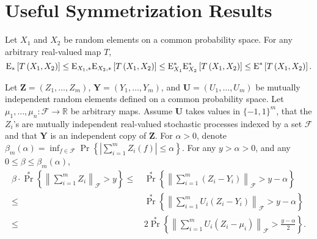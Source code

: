 
\section{Useful Symmetrization Results}

\begin{lemma}
\label{lem--vdvw23-lem-1-2-6}
Let \(X_{1}\) and \(X_{2}\) be random elements on a common probability space.
For any arbitrary real-valued map \(T\),
\begin{equation*}
  \mathrm{E}_{\ast} \left[ T \left( X_{1}, X_{2} \right) \right] \leq \mathrm{E}_{X_{1},
  \ast} \mathrm{E}_{X_{2}, \ast} \left[ T \left( X_{1}, X_{2} \right) \right] \leq
  \mathrm{E}_{X_{1}}^{\ast} \mathrm{E}_{X_{2}}^{\ast} \left[ T \left( X_{1}, X_{2} \right)
  \right] \leq \mathrm{E}^{\ast} \left[ T \left( X_{1}, X_{2} \right) \right].
\end{equation*}
\end{lemma}

\begin{lemma}
\label{lem--symm-1}
Let \(\mathbf{Z} = \left( Z_{1}, \dots, Z_{m} \right)\), \(\mathbf{Y} = \left(
Y_{1}, \dots, Y_{m} \right)\), and \(\mathbf{U} = \left( U_{1}, \dots, U_{m}
\right)\) be mutually independent random elements defined on a common
probability space.
Let \(\mu_{1}, \dots, \mu_{n} : \mathcal{F} \to \mathbb{R}\) be arbitrary maps.
Assume \(\mathbf{U}\) takes values in \(\{- 1, 1\}^{m}\), that the \(Z_{i}\)'s
are mutually independent real-valued stochastic processes indexed by a set
\(\mathcal{F}\) and that \(\mathbf{Y}\) is an independent copy of
\(\mathbf{Z}\).
For \(\alpha > 0\), denote \(\beta_{m} (\alpha) = \inf_{f \in \mathcal{F}} \Pr
\left\{ \left| \sum_{i = 1}^{m} Z_{i} (f) \right| \leq \alpha \right\}\).
For any \(y > \alpha > 0\), and any \(0 \leq \beta \leq \beta_{m} (\alpha)\),
\begin{align}
  \beta \cdot \Pr^{\ast} \left\{ \left\| \sum_{i = 1}^{m} Z_{i}
  \right\|_{\mathcal{F}} > y \right\} \leq
  & \, \Pr^{\ast} \left\{ \left\| \sum_{i = 1}^{m} \left( Z_{i} - Y_{i} \right)
  \right\|_{\mathcal{F}} > y - \alpha \right\}
  \label{eqn--symm-1}
  \\
  \leq
  & \, \Pr^{\ast} \left\{ \left\| \sum_{i = 1}^{m} U_{i} \left( Z_{i} - Y_{i}
  \right) \right\|_{\mathcal{F}} > y - \alpha \right\}
  \label{eqn--symm-2}
  \\
  \leq
  & \, 2 \Pr^{\ast} \left\{ \left\| \sum_{i = 1}^{m} U_{i} \left( Z_{i} -
  \mu_{i} \right) \right\|_{\mathcal{F}} > \frac{y - \alpha}{2} \right\}.
  \label{eqn--symm-3}
\end{align}
\end{lemma}

